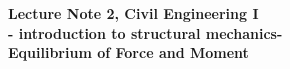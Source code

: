 \documentclass[10pt,a4j]{article}
\newlength{\minitwocolumn}
\begin{document}
\newcommand{\fat}[1]{\mbox{\boldmath $#1$}}
\newcommand{\D}{\partial}
\newcommand{\w}{\omega}
\newcommand{\ga}{\alpha}
\newcommand{\gb}{\beta}
\newcommand{\gx}{\xi}
\newcommand{\gz}{\zeta}
\newcommand{\vhat}[1]{\hat{\fat{#1}}}
\newcommand{\spc}{\vspace{0.7\baselineskip}}
\newcommand{\halfspc}{\vspace{0.3\baselineskip}}

\newcommand{\twofig}[2]
 {
   \begin{figure}
     \begin{minipage}[t]{\minitwocolumn}
         \begin{center}   #1
         \end{center}
     \end{minipage}
         \hspace{\columnsep}
     \begin{minipage}[t]{\minitwocolumn}
         \begin{center} #2
         \end{center}
     \end{minipage}
   \end{figure}
 }
\begin{center}
	{\Large \bf Lecture Note 2, Civil Engineering I \\
	- introduction to structural mechanics-\\
	Equilibrium of Force and Moment
	}  \\
\end{center}
\vspace{1.5cm}
\setcounter{section}{1}
\end{document}

